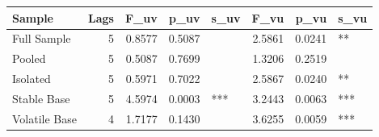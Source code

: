 \begin{tabular}{lrrrlrrl}
\toprule
Sample & Lags & F_uv & p_uv & s_uv & F_vu & p_vu & s_vu \\
\midrule
Full Sample & 5 & 0.8577 & 0.5087 &  & 2.5861 & 0.0241 & ** \\
Pooled & 5 & 0.5087 & 0.7699 &  & 1.3206 & 0.2519 &  \\
Isolated & 5 & 0.5971 & 0.7022 &  & 2.5867 & 0.0240 & ** \\
Stable Base & 5 & 4.5974 & 0.0003 & *** & 3.2443 & 0.0063 & *** \\
Volatile Base & 4 & 1.7177 & 0.1430 &  & 3.6255 & 0.0059 & *** \\
\bottomrule
\end{tabular}
